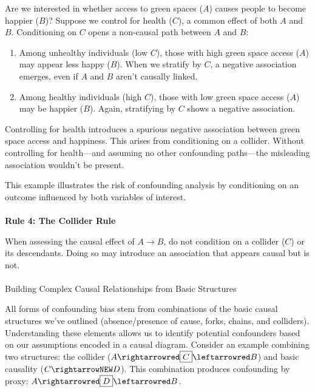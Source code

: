\documentclass[
  singlecolumn]{article}
\makeatletter
\let\oldparagraph\paragraph
\renewcommand{\paragraph}{
    \@ifstar
      \xxxParagraphStar
      \xxxParagraphNoStar
  }
\newcommand{\xxxParagraphStar}[1]{\oldparagraph*{#1}\mbox{}}
\newcommand{\xxxParagraphNoStar}[1]{\oldparagraph{#1}\mbox{}}
\makeatother
\begin{document}
Are we interested in whether access to green spaces (\(A\)) causes
people to become happier (\(B\))? Suppose we control for health (\(C\)),
a common effect of both \(A\) and \(B\). Conditioning on \(C\) opens a
non-causal path between \(A\) and \(B\):

\begin{enumerate}
\def\labelenumi{\arabic{enumi}.}
\item
  Among unhealthy individuals (low \(C\)), those with high green space
  access (\(A\)) may appear less happy (\(B\)). When we stratify by
  \(C\), a negative association emerges, even if \(A\) and \(B\) aren't
  causally linked.
\item
  Among healthy individuals (high \(C\)), those with low green space
  access (\(A\)) may be happier (\(B\)). Again, stratifying by \(C\)
  shows a negative association.
\end{enumerate}

Controlling for health introduces a spurious negative association
between green space access and happiness. This arises from conditioning
on a collider. Without controlling for health---and assuming no other
confounding paths---the misleading association wouldn't be present.

This example illustrates the risk of confounding analysis by
conditioning on an outcome influenced by both variables of interest.

\paragraph{\texorpdfstring{\textbf{Rule 4: The Collider
Rule}}{Rule 4: The Collider Rule}}\label{rule-4-the-collider-rule}

When assessing the causal effect of \(A \to B\), do not condition on a
collider (\(C\)) or its descendants. Doing so may introduce an
association that appears causal but is not.

\paragraph{Building Complex Causal Relationships from Basic
Structures}\label{building-complex-causal-relationships-from-basic-structures}

All forms of confounding bias stem from combinations of the basic causal
structures we've outlined (absence/presence of cause, forks, chains, and
colliders). Understanding these elements allows us to identify potential
confounders based on our assumptions encoded in a causal diagram.
Consider an example combining two structures: the collider
(\(A \rightarrowred \boxed{C} \leftarrowred B\)) and basic causality
(\(C \rightarrowNEW D\)). This combination produces confounding by
proxy: \(A \rightarrowred \boxed{D} \leftarrowred B\).
\end{document}
